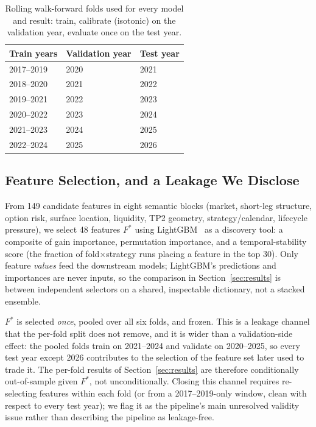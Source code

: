 \documentclass[sigconf,review]{acmart}
\begin{document}
\begin{table}[t]
\centering
\footnotesize
\begin{tabular}{lll}
\toprule
Train years & Validation year & Test year \\
\midrule
2017--2019 & 2020 & 2021 \\
2018--2020 & 2021 & 2022 \\
2019--2021 & 2022 & 2023 \\
2020--2022 & 2023 & 2024 \\
2021--2023 & 2024 & 2025 \\
2022--2024 & 2025 & 2026 \\
\bottomrule
\end{tabular}
\caption{Rolling walk-forward folds used for every model and result: train, calibrate (isotonic) on the validation year, evaluate once on the test year.}
\label{tab:folds}
\end{table}

\subsection{Feature Selection, and a Leakage We Disclose}
\label{sec:features}
From 149 candidate features in eight semantic blocks (market, short-leg structure, option risk, surface location, liquidity, TP2 geometry, strategy/calendar, lifecycle pressure), we select 48 features $F^{\ast}$ using LightGBM~\cite{ke2017lightgbm} as a discovery tool: a composite of gain importance, permutation importance, and a temporal-stability score (the fraction of fold$\times$strategy runs placing a feature in the top 30). Only feature \emph{values} feed the downstream models; LightGBM's predictions and importances are never inputs, so the comparison in Section~\ref{sec:results} is between independent selectors on a shared, inspectable dictionary, not a stacked ensemble.

$F^{\ast}$ is selected \emph{once}, pooled over all six folds, and frozen. This is a leakage channel that the per-fold split does not remove, and it is wider than a validation-side effect: the pooled folds train on 2021--2024 and validate on 2020--2025, so every test year except 2026 contributes to the selection of the feature set later used to trade it. The per-fold results of Section~\ref{sec:results} are therefore conditionally out-of-sample given $F^{\ast}$, not unconditionally. Closing this channel requires re-selecting features within each fold (or from a 2017--2019-only window, clean with respect to every test year); we flag it as the pipeline's main unresolved validity issue rather than describing the pipeline as leakage-free.
\end{document}
